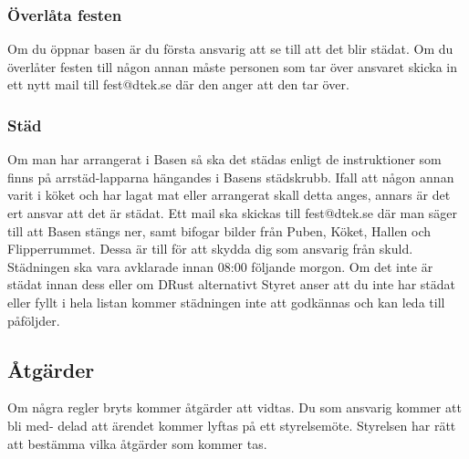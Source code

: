 \subsubsection{Överlåta festen}
Om du öppnar basen är du första ansvarig att se till att det blir städat. Om du överlåter
festen till någon annan måste personen som tar över ansvaret skicka in ett nytt mail till
fest@dtek.se där den anger att den tar över.

\subsubsection{Städ}
Om man har arrangerat i Basen så ska det städas enligt de instruktioner som finns på
arrstäd-lapparna hängandes i Basens städskrubb. Ifall att någon annan varit i köket och
har lagat mat eller arrangerat skall detta anges, annars är det ert ansvar att det är städat.
Ett mail ska skickas till fest@dtek.se där man säger till att Basen stängs ner, samt bifogar
bilder från Puben, Köket, Hallen och Flipperrummet. Dessa är till för att skydda dig som
ansvarig från skuld. Städningen ska vara avklarade innan 08:00 följande morgon. Om det
inte är städat innan dess eller om DRust alternativt Styret anser att du inte har städat
eller fyllt i hela listan kommer städningen inte att godkännas och kan leda till påföljder.

\subsection{Åtgärder}
Om några regler bryts kommer åtgärder att vidtas. Du som ansvarig kommer att bli med-
delad att ärendet kommer lyftas på ett styrelsemöte. Styrelsen har rätt att bestämma vilka
åtgärder som kommer tas.

